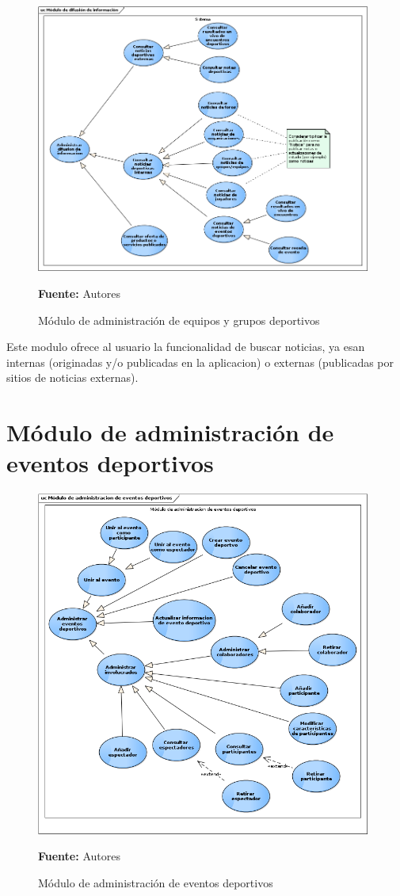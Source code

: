 \begin{figure}[!htb]
  \begin{center}
    \includegraphics[width=11cm]{./imagenes/casos_uso/difusion_informacion.png}
    \caption{Módulo de administración de equipos y grupos deportivos}
    \label{fig:cu_admin_equip_grup}
    \textbf{Fuente:} Autores
  \end{center}
\end{figure}

Este modulo ofrece al usuario la funcionalidad de buscar noticias, ya esan internas (originadas y/o publicadas en la aplicacion) o externas (publicadas por sitios de noticias externas).

\section{Módulo de administración de eventos deportivos}

\begin{figure}[!htb]
  \begin{center}
    \includegraphics[width=11cm]{./imagenes/casos_uso/gestion_evento.png}
    \caption{Módulo de administración de eventos deportivos}
    \label{fig:cu_admin_eve}
    \textbf{Fuente:} Autores
  \end{center}
\end{figure}

